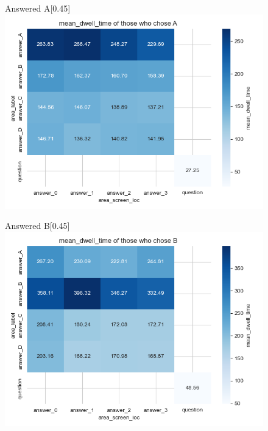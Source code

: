 \documentclass{article}
\begin{document}
        \begin{figure}[H]
          \centering
          \begin{subcaptionbox}{Answered A\label{fig:A6}}[0.45\textwidth]
            {\centering\includegraphics[width=\linewidth]{plots/matrix_plots/matrix_mean_dwell_time_A_gatherers.png}}
          \end{subcaptionbox}
          \hfill
          \begin{subcaptionbox}{Answered B\label{fig:B6}}[0.45\textwidth]
            {\centering\includegraphics[width=\linewidth]{plots/matrix_plots/matrix_mean_dwell_time_B_gatherers.png}}
          \end{subcaptionbox}
          

\end{figure}
\end{document}
